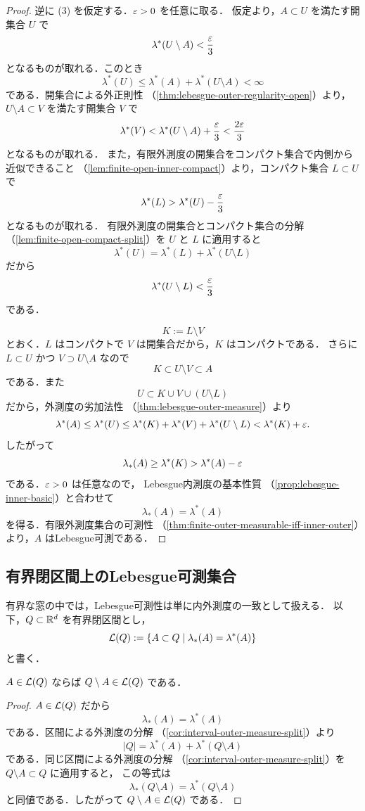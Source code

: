 \begin{proof}
逆に (3) を仮定する．$\varepsilon>0$ を任意に取る．
仮定より，$A\subset U$ を満たす開集合 $U$ で
\[
\lambda^*(U\setminus A)<\frac{\varepsilon}{3}
\]
となるものが取れる．このとき
\[
\lambda^*(U)\le \lambda^*(A)+\lambda^*(U\setminus A)<\infty
\]
である．開集合による外正則性
（\cref{thm:lebesgue-outer-regularity-open}）より，
$U\setminus A\subset V$ を満たす開集合 $V$ で
\[
\lambda^*(V)<\lambda^*(U\setminus A)+\frac{\varepsilon}{3}
<\frac{2\varepsilon}{3}
\]
となるものが取れる．
また，有限外測度の開集合をコンパクト集合で内側から近似できること
（\cref{lem:finite-open-inner-compact}）より，コンパクト集合 $L\subset U$ で
\[
\lambda^*(L)>\lambda^*(U)-\frac{\varepsilon}{3}
\]
となるものが取れる．
有限外測度の開集合とコンパクト集合の分解
（\cref{lem:finite-open-compact-split}）を $U$ と $L$ に適用すると
\[
\lambda^*(U)=\lambda^*(L)+\lambda^*(U\setminus L)
\]
だから
\[
\lambda^*(U\setminus L)<\frac{\varepsilon}{3}
\]
である．

\[
K:=L\setminus V
\]
とおく．$L$ はコンパクトで $V$ は開集合だから，$K$ はコンパクトである．
さらに $L\subset U$ かつ $V\supset U\setminus A$ なので
\[
K\subset U\setminus V\subset A
\]
である．また
\[
U\subset K\cup V\cup(U\setminus L)
\]
だから，外測度の劣加法性
（\cref{thm:lebesgue-outer-measure}）より
\[
\lambda^*(A)
\le
\lambda^*(U)
\le
\lambda^*(K)+\lambda^*(V)+\lambda^*(U\setminus L)
<
\lambda^*(K)+\varepsilon.
\]
したがって
\[
\lambda_*(A)\ge \lambda^*(K)>\lambda^*(A)-\varepsilon
\]
である．$\varepsilon>0$ は任意なので，
Lebesgue内測度の基本性質
（\cref{prop:lebesgue-inner-basic}）と合わせて
\[
\lambda_*(A)=\lambda^*(A)
\]
を得る．有限外測度集合の可測性
（\cref{thm:finite-outer-measurable-iff-inner-outer}）より，$A$ はLebesgue可測である．
\end{proof}

\subsection{有界閉区間上のLebesgue可測集合}

有界な窓の中では，Lebesgue可測性は単に内外測度の一致として扱える．
以下，$Q\subset\mathbb R^d$ を有界閉区間とし，
\[
\mathcal L(Q):=\{A\subset Q\mid \lambda_*(A)=\lambda^*(A)\}
\]
と書く．

\begin{lemma}[有界閉区間内の補集合]\label{lem:local-measurable-complement}
$A\in\mathcal L(Q)$ ならば $Q\setminus A\in\mathcal L(Q)$ である．
\end{lemma}
\begin{proof}
$A\in\mathcal L(Q)$ だから
\[
\lambda_*(A)=\lambda^*(A)
\]
である．区間による外測度の分解
（\cref{cor:interval-outer-measure-split}）より
\[
|Q|=\lambda^*(A)+\lambda^*(Q\setminus A)
\]
である．同じ区間による外測度の分解
（\cref{cor:interval-outer-measure-split}）を $Q\setminus A\subset Q$ に適用すると，
この等式は
\[
\lambda_*(Q\setminus A)=\lambda^*(Q\setminus A)
\]
と同値である．したがって $Q\setminus A\in\mathcal L(Q)$ である．
\end{proof}

